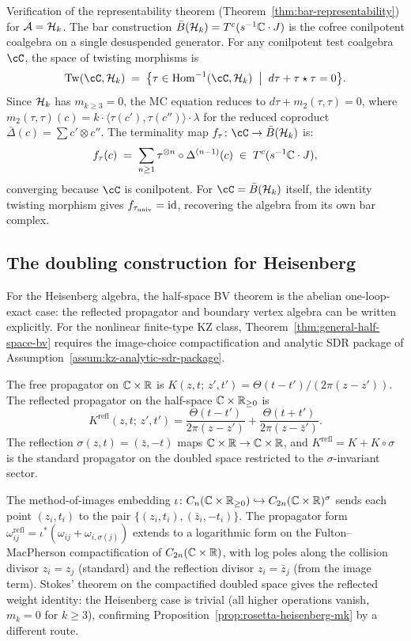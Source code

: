 \begin{computation}
\label{comp:heisenberg-classifying-space}
Verification of the representability theorem (Theorem~\ref{thm:bar-representability}) for $\mathcal{A} = \mathcal{H}_k$. The bar construction $\bar{B}(\mathcal{H}_k) = T^c(s^{-1}\mathbb{C} \cdot J)$ is the cofree conilpotent coalgebra on a single desuspended generator. For any conilpotent test coalgebra $\cC$, the space of twisting morphisms is
\[
\mathrm{Tw}(\cC, \cH_k) \;=\; \bigl\{\tau \in \Hom^{-1}(\cC, \cH_k) \;\bigm|\; d\tau + \tau \star \tau = 0\bigr\}.
\]
Since $\mathcal{H}_k$ has $m_{k \geq 3} = 0$, the MC equation reduces to $d\tau + m_2(\tau, \tau) = 0$, where $m_2(\tau,\tau)(c) = k \cdot \langle \tau(c'), \tau(c'') \rangle \cdot \lambda$ for the reduced coproduct $\bar\Delta(c) = \sum c' \otimes c''$. The terminality map $f_\tau \colon \cC \to \barB(\cH_k)$ is:
\[
f_\tau(c) \;=\; \sum_{n \geq 1} \tau^{\otimes n} \circ \Delta^{(n-1)}(c) \;\in\; T^c(s^{-1}\mathbb{C} \cdot J),
\]
converging because $\cC$ is conilpotent. For $\cC = \barB(\cH_k)$ itself, the identity twisting morphism gives $f_{\tau_{\mathrm{univ}}} = \mathrm{id}$, recovering the algebra from its own bar complex.
\end{computation}

\subsection{The doubling construction for Heisenberg}

For the Heisenberg algebra, the half-space BV theorem is the abelian
one-loop-exact case: the reflected propagator and boundary vertex
algebra can be written explicitly. For the nonlinear finite-type KZ
class, Theorem~\ref{thm:general-half-space-bv} requires the
image-choice compactification and analytic SDR package of
Assumption~\ref{assum:kz-analytic-sdr-package}.

The free propagator on $\mathbb{C}\times\mathbb{R}$ is
$K(z,t;\,z',t')=\Theta(t-t')/(2\pi(z-z'))$. The reflected
propagator on the half-space $\mathbb{C}\times\mathbb{R}_{\ge 0}$ is
\[
K^{\mathrm{refl}}(z,t;\,z',t')
=\frac{\Theta(t-t')}{2\pi(z-z')}
+\frac{\Theta(t+t')}{2\pi(z-\bar z')}.
\]
The reflection $\sigma(z,t)=(\bar z,-t)$ maps
$\mathbb{C}\times\mathbb{R}\to\mathbb{C}\times\mathbb{R}$, and $K^{\mathrm{refl}}=K+K\circ\sigma$ is
the standard propagator on the doubled space restricted to the
$\sigma$-invariant sector.

The method-of-images embedding $\iota\colon C_n(\mathbb{C}\times\mathbb{R}_{\ge 0})
\hookrightarrow C_{2n}(\mathbb{C}\times\mathbb{R})^{\sigma}$ sends each point
$(z_i,t_i)$ to the pair $\{(z_i,t_i),(\bar z_i,-t_i)\}$. The
propagator form $\omega_{ij}^{\mathrm{refl}}=\iota^*(\omega_{ij}+
\omega_{i,\sigma(j)})$ extends to a logarithmic form on the
Fulton--MacPherson compactification of $C_{2n}(\mathbb{C}\times\mathbb{R})$, with
log poles along the collision divisor $z_i=z_j$ (standard) and the
reflection divisor $z_i=\bar z_j$ (from the image term). Stokes'
theorem on the compactified doubled space gives the reflected weight
identity: the Heisenberg case is trivial (all higher operations vanish,
$m_k=0$ for $k\ge 3$), confirming
Proposition~\ref{prop:rosetta-heisenberg-mk} by a different route.

